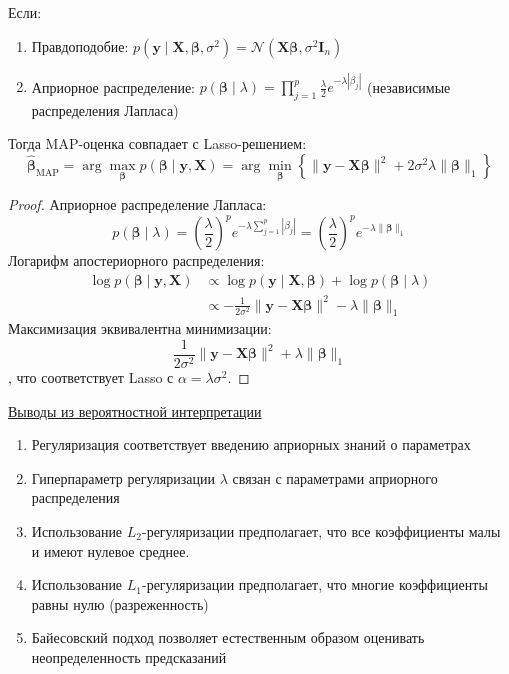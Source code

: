 \begin{theorem}
    Если:
    \begin{enumerate}
        \item Правдоподобие: $p(\bm{y} \mid \bm{X}, \bm{\beta}, \sigma^2) = \mathcal{N}(\bm{X}\bm{\beta}, \sigma^2 \bm{I}_n)$
        \item Априорное распределение: $p(\bm{\beta} \mid \lambda) = \prod_{j=1}^p \frac{\lambda}{2}
        e^{-\lambda|\beta_j|}$ (независимые распределения Лапласа)
    \end{enumerate}
    Тогда MAP-оценка совпадает с Lasso-решением:
    \[ \hat{\bm{\beta}}_{\text{MAP}} = \arg\max_{\bm{\beta}} p(\bm{\beta} \mid \bm{y}, \bm{X}) =
    \arg\min_{\bm{\beta}} \left\{ \|\bm{y} - \bm{X}\bm{\beta}\|^2 + 2\sigma^2\lambda \|\bm{\beta}\|_1 \right\} \]
\end{theorem}

\begin{proof}
    Априорное распределение Лапласа:
    \[ p(\bm{\beta} \mid \lambda) = \left(\frac{\lambda}{2}\right)^p e^{-\lambda \sum_{j=1}^p |\beta_j|} =
    \left(\frac{\lambda}{2}\right)^p e^{-\lambda \|\bm{\beta}\|_1} \]
    Логарифм апостериорного распределения:
    \begin{align*}
        \log p(\bm{\beta} \mid \bm{y}, \bm{X}) &\propto \log p(\bm{y} \mid \bm{X}, \bm{\beta}) + \log p(\bm{\beta} \mid \lambda) \\
        &\propto -\frac{1}{2\sigma^2}\|\bm{y} - \bm{X}\bm{\beta}\|^2 - \lambda \|\bm{\beta}\|_1
    \end{align*}
    Максимизация эквивалентна минимизации:
    \[ \frac{1}{2\sigma^2}\|\bm{y} - \bm{X}\bm{\beta}\|^2 + \lambda \|\bm{\beta}\|_1 \],
    что соответствует Lasso с $\alpha = \lambda\sigma^2$.
\end{proof}

\underline{Выводы из вероятностной интерпретации}

\begin{enumerate}
    \item Регуляризация соответствует введению априорных знаний о параметрах
    \item Гиперпараметр регуляризации $\lambda$ связан с параметрами априорного распределения
    \item Использование $L_2$-регуляризации предполагает, что все коэффициенты малы и имеют нулевое среднее.
    \item Использование $L_1$-регуляризации предполагает, что многие коэффициенты равны нулю (разреженность)
    \item Байесовский подход позволяет естественным образом оценивать неопределенность предсказаний
\end{enumerate}

